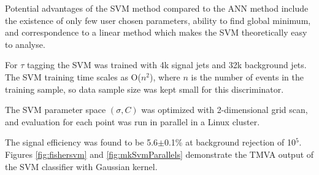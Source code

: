 \documentclass[a4paper]{jpconf}
\begin{document}
Potential advantages of the SVM method compared to the ANN method
include the existence of only few user chosen parameters, ability to find global minimum, and
correspondence to a linear method which makes the SVM theoretically easy to analyse.

For $\tau$ tagging the SVM was trained with 4k signal jets and 32k background jets.
The SVM training time  scales as O($n^2$), where $n$ is the number of events in the training sample,
so data sample size was kept small for this discriminator.

The SVM parameter space $(\sigma, C)$
was optimized with 2-dimensional grid scan,  
and evaluation for each point was run in parallel in a Linux cluster.

The signal efficiency was found to be 5.6$\pm$0.1\% at background rejection of 10$^5$.
Figures 
\ref{fig:fishersvm}
 and \ref{fig:mkSvmParallels} demonstrate the TMVA output of the SVM classifier
with Gaussian kernel.


%

 
\end{document}
